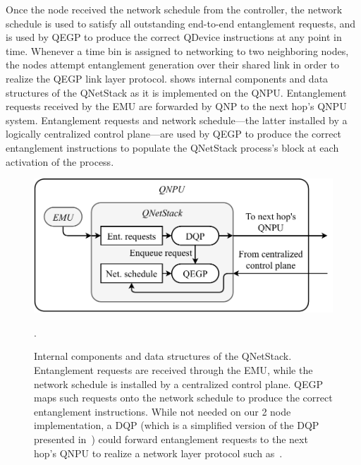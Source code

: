Once the node received the network schedule from the controller, the network schedule is used to satisfy all outstanding end-to-end entanglement requests, and is used by \ac{QEGP} to produce the correct \ac{QDevice} instructions at any point in time. Whenever a time bin is assigned to networking to two neighboring nodes, the nodes attempt entanglement generation over their shared link in order to realize the \ac{QEGP} link layer protocol. 
 shows internal components and data structures of the \ac{QNetStack} as it is implemented on the \ac{QNPU}. Entanglement requests received by the \ac{EMU} are forwarded by \ac{QNP} to the next hop's \ac{QNPU} system. Entanglement requests and network schedule---the latter installed by a logically centralized control plane---are used by \ac{QEGP} to produce the correct entanglement instructions to populate the \ac{QNetStack} process's block at each activation of the process.

\begin{figure}
\begin{center}
\includegraphics[width=\linewidth]{figures/qnodeos/supplementary/qnetstack-impl.pdf}
\end{center}
\caption[]{Internal components and data structures of the \acf{QNetStack}. Entanglement requests are received through the \acf{EMU}, while the network schedule is installed by a centralized control plane. 
\acf{QEGP} maps such requests onto the network schedule to produce the correct entanglement instructions. While not needed on our 2 node implementation, a \ac{DQP} (which is a simplified version of the \ac{DQP} presented in~\cite[Section 5.2.1]{dahlberg_2019_egp}) could forward entanglement requests to the next hop's \acf{QNPU} to realize a network layer protocol such as~\cite{kozlowski_2020_qnp}.}.
\label{qnodeos:fig:qnetstack-impl}
\end{figure}

